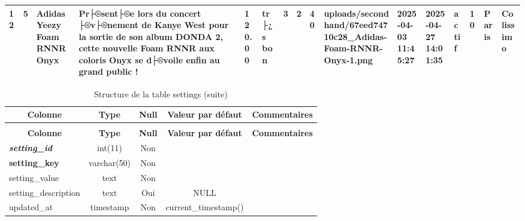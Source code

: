 \begin{longtable}{|l|l|l|l|l|l|l|l|l|l|l|l|l|l|l|l|}
12 & 5 & Adidas Yeezy Foam RNNR Onyx & Pr├®sent├®e lors du concert ├®v├®nement de Kanye West pour la sortie de son album DONDA 2, cette nouvelle Foam RNNR aux coloris Onyx se d├®voile enfin au grand public ! & 120.00 & tr├¿s bon & 3 & 2 & 40 & uploads/secondhand/67eed74710c28\_Adidas-Foam-RNNR-Onyx-1.png & 2025-04-03 11:45:27 & 2025-04-27 14:01:35 & actif & 10 & Paris & Colissimo \\ \hline 
 \end{longtable}

%
%
 \begin{longtable}{|l|c|c|c|l|} 
 \caption{Structure de la table settings} \label{tab:settings-structure} \\
 \hline \multicolumn{1}{|c|}{\textbf{Colonne}} & \multicolumn{1}{|c|}{\textbf{Type}} & \multicolumn{1}{|c|}{\textbf{Null}} & \multicolumn{1}{|c|}{\textbf{Valeur par défaut}} & \multicolumn{1}{|c|}{\textbf{Commentaires}} \\ \hline \hline
\endfirsthead
 \caption{Structure de la table settings (suite)} \\ 
 \hline \multicolumn{1}{|c|}{\textbf{Colonne}} & \multicolumn{1}{|c|}{\textbf{Type}} & \multicolumn{1}{|c|}{\textbf{Null}} & \multicolumn{1}{|c|}{\textbf{Valeur par défaut}} & \multicolumn{1}{|c|}{\textbf{Commentaires}} \\ \hline \hline \endhead \endfoot 
\textbf{\textit{setting\_id}} & int(11) & Non &  \\ \hline 
\textbf{setting\_key} & varchar(50) & Non &  \\ \hline 
setting\_value & text & Non &  \\ \hline 
setting\_description & text & Oui & NULL \\ \hline 
updated\_at & timestamp & Non & current\_timestamp() \\ \hline 
 \end{longtable}


